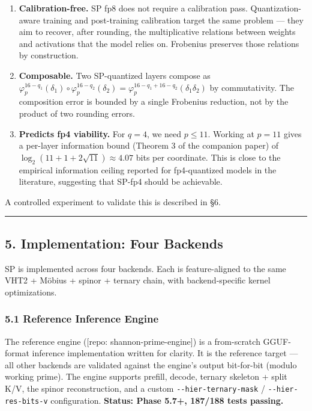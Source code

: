 \documentclass[
  11pt,
]{article}
\begin{document}
\begin{enumerate}
\def\labelenumi{\arabic{enumi}.}
\item
  \textbf{Calibration-free.} SP fp8 does not require a calibration pass.
  Quantization-aware training and post-training calibration target the
  same problem --- they aim to recover, after rounding, the
  multiplicative relations between weights and activations that the
  model relies on. Frobenius preserves those relations by construction.
\item
  \textbf{Composable.} Two SP-quantized layers compose as
  \(\varphi_p^{16-q_1}(\delta_1) \circ \varphi_p^{16-q_2}(\delta_2) = \varphi_p^{16-q_1+16-q_2}(\delta_1 \delta_2)\)
  by commutativity. The composition error is bounded by a single
  Frobenius reduction, not by the product of two rounding errors.
\item
  \textbf{Predicts fp4 viability.} For \(q = 4\), we need \(p \leq 11\).
  Working at \(p = 11\) gives a per-layer information bound (Theorem 3
  of the companion paper) of
  \(\log_2(11 + 1 + 2\sqrt{11}) \approx 4.07\) bits per coordinate. This
  is close to the empirical information ceiling reported for
  fp4-quantized models in the literature, suggesting that SP-fp4 should
  be achievable.
\end{enumerate}

A controlled experiment to validate this is described in §6.

\begin{center}\rule{0.5\linewidth}{0.5pt}\end{center}

\hypertarget{implementation-four-backends}{%
\subsection{5. Implementation: Four
Backends}\label{implementation-four-backends}}

SP is implemented across four backends. Each is feature-aligned to the
same VHT2 + Möbius + spinor + ternary chain, with backend-specific
kernel optimizations.

\hypertarget{reference-inference-engine}{%
\subsubsection{5.1 Reference Inference
Engine}\label{reference-inference-engine}}

The reference engine ({[}repo: shannon-prime-engine{]}) is a
from-scratch GGUF-format inference implementation written for clarity.
It is the reference target --- all other backends are validated against
the engine's output bit-for-bit (modulo working prime). The engine
supports prefill, decode, ternary skeleton + split K/V, the spinor
reconstruction, and a custom \texttt{-\/-hier-ternary-mask} /
\texttt{-\/-hier-res-bits-v} configuration. \textbf{Status: Phase 5.7+,
187/188 tests passing.}
\end{document}

